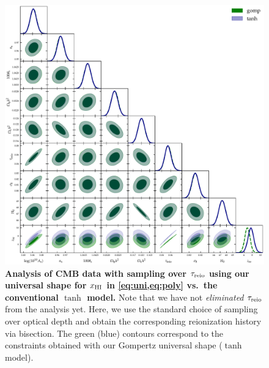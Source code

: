 

\begin{figure}[tb]
\centering
\includegraphics[width=\linewidth]{figs/gomp_tanh_triangle_tau.pdf}
\caption{\textbf{Analysis of CMB data with sampling over $\tau_{\mathrm{reio}}$
using our universal shape for $x_{\mathrm{HI}}$ in \cref{eq:uni,eq:poly} vs.\ the
conventional $\tanh$ model.}
Note that we have not \emph{eliminated} $\tau_{\mathrm{reio}}$ from the analysis
yet.
Here, we use the standard choice of sampling over optical depth and
obtain the corresponding reionization history via bisection.
The green (blue) contours correspond to the constraints obtained with
our Gompertz universal shape ($\tanh$ model).}
\label{fig:tg}
\end{figure}

